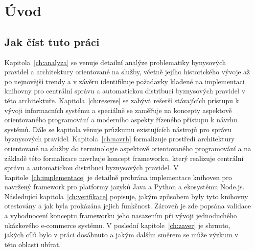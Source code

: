 \usepackage[T1]{fontenc}
\usepackage[utf8]{inputenc}


\chapter{Úvod}\label{ch:uvod}


\section{Jak číst tuto práci}

Kapitola~\ref{ch:analyza} se venuje detailní analýze problematiky bynysových pravidel a
architektury orientované na služby, včetně jejího historického vývoje až po nejnovější trendy
a v závěru identifikuje požadavky kladené na implementaci knihovny pro centrální správu a
automatickou distribuci byznysových pravidel v této architektuře. Kapitola~\ref{ch:reserse}
se zabývá rešerší stávajících prístupu k vývoji informacních systému a speciálně se zaměřuje
na koncepty aspektově orientovaného programování a moderního aspekty řízeného přístupu k návrhu
systémů. Dále se kapitola věnuje průzkumu existujících nástrojů pro správu byznysových pravidel.
Kapitola~\ref{ch:navrh} formalizuje prostředí architektury orientované na služby do terminologie
aspektově orientovaného programování a na základě této formalizace navrhuje koncept frameworku,
který realizuje centrální správu a automatickou distribuci byznysových pravidel.
V kapitole~\ref{ch:implementace} je detailně probrána implementace knihoven pro navržený framework
pro platformy jazyků Java a Python a ekosystému Node.js. Následující kapitola~\ref{ch:verifikace}
popisuje, jakým způsobem byly tyto knihovny otestovány a jak byla prokázána jejich funkčnost. Zároveň
je zde popsána validace a vyhodnocení konceptu frameworku jeho nasazením při vývoji
jednoduchého ukázkového e-commerce systému. V poslední kapitole~\ref{ch:zaver} je shrnuto, jakých
cílů bylo v práci dosáhnuto a jakým dalším směrem se může výzkum v této oblasti ubírat.
